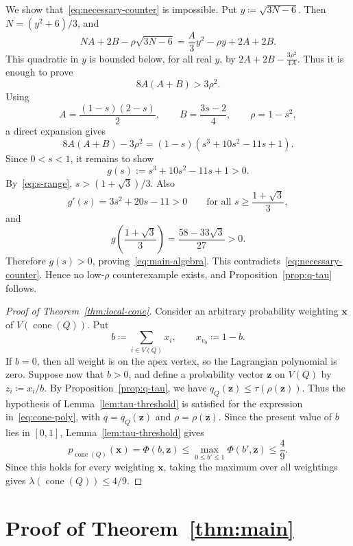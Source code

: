 \documentclass[10pt]{article}
\numberwithin{equation}{section}
\theoremstyle{definition}
\theoremstyle{remark}
\newcommand{\La}{\lambda}
\newcommand{\cone}{\operatorname{cone}}
\begin{document}
We show that~\eqref{eq:necessary-counter} is impossible. Put $y \coloneqq \sqrt{3N-6}$. Then $N=(y^2+6)/3$, and
\[
        NA+2B-\rho\sqrt{3N-6}
        =\frac A3y^2-\rho y+2A+2B.
\]
This quadratic in $y$ is bounded below, for all real $y$, by $2A+2B-\frac{3\rho^2}{4A}$. Thus it is enough to prove
\begin{equation}\label{eq:main-algebra}
        8A(A+B)>3\rho^2.
\end{equation}
Using
\[
        A=\frac{(1-s)(2-s)}2,
        \qquad
        B=\frac{3s-2}{4},
        \qquad
        \rho=1-s^2,
\]
a direct expansion gives
\[
        8A(A+B)-3\rho^2
        =(1-s)(s^3+10s^2-11s+1).
\]
Since $0<s<1$, it remains to show
\[
        g(s):=s^3+10s^2-11s+1>0.
\]
By~\eqref{eq:s-range}, $s>(1+\sqrt3)/3$. Also
\[
        g'(s)=3s^2+20s-11>0
        \qquad\text{for all }s\ge\frac{1+\sqrt3}{3},
\]
and
\[
        g\left(\frac{1+\sqrt3}{3}\right)
        =\frac{58-33\sqrt3}{27}>0.
\]
Therefore $g(s)>0$, proving~\eqref{eq:main-algebra}. This contradicts~\eqref{eq:necessary-counter}. Hence no low-$\rho$ counterexample exists, and Proposition~\ref{prop:q-tau} follows.

\begin{proof}[Proof of Theorem~\ref{thm:local-cone}]
Consider an arbitrary probability weighting $\mathbf{x}$ of $V(\cone(Q))$. Put
\[
        b \coloneqq \sum_{i\in V(Q)}x_i,
        \qquad
        x_{v_0} \coloneqq 1-b.
\]
If $b=0$, then all weight is on the apex vertex, so the Lagrangian polynomial is zero. Suppose now that $b>0$, and define a probability vector $\mathbf{z}$ on $V(Q)$ by $z_i \coloneqq x_i/b$. 
By Proposition~\ref{prop:q-tau}, we have $q_Q(\mathbf{z})\le\tau(\rho(\mathbf{z}))$. Thus the hypothesis of Lemma~\ref{lem:tau-threshold} is satisfied for the expression in~\eqref{eq:cone-poly}, with $q=q_Q(\mathbf{z})$ and $\rho=\rho(\mathbf{z})$. Since the present value of $b$ lies in $[0,1]$, Lemma~\ref{lem:tau-threshold} gives
\[
        p_{\cone(Q)}(\mathbf{x})
        =
        \Phi(b,\mathbf{z})
        \le
        \max_{0\le b'\le1}\Phi(b',\mathbf{z})
        \le \frac49.
\]
Since this holds for every weighting $\mathbf{x}$, taking the maximum over all weightings gives $\La(\cone(Q))\le4/9$.
\end{proof}


\section{Proof of Theorem~\ref{thm:main}}\label{SEC:proof-main}
\end{document}
